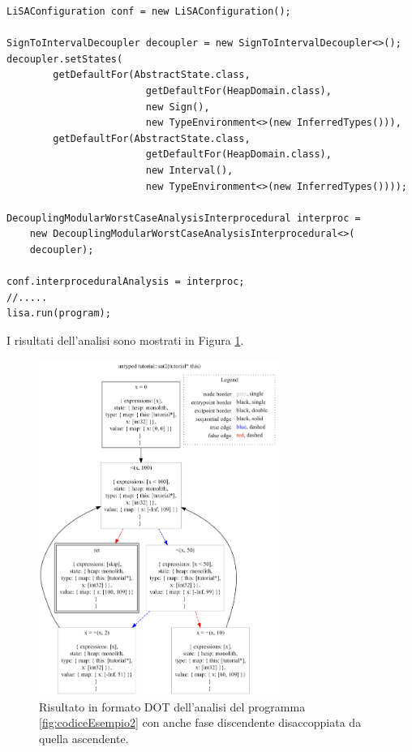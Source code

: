 \begin{lstlisting}[belowskip=-1.1 \baselineskip]
LiSAConfiguration conf = new LiSAConfiguration();

SignToIntervalDecoupler decoupler = new SignToIntervalDecoupler<>();
decoupler.setStates(
        getDefaultFor(AbstractState.class, 
                        getDefaultFor(HeapDomain.class), 
                        new Sign(), 
                        new TypeEnvironment<>(new InferredTypes())), 
        getDefaultFor(AbstractState.class, 
                        getDefaultFor(HeapDomain.class), 
                        new Interval(), 
                        new TypeEnvironment<>(new InferredTypes())));

DecouplingModularWorstCaseAnalysisInterprocedural interproc = 
    new DecouplingModularWorstCaseAnalysisInterprocedural<>(
    decoupler);

conf.interproceduralAnalysis = interproc;
//.....
lisa.run(program);
\end{lstlisting}
I risultati dell'analisi sono mostrati in Figura \ref{fig:risultatoDecoup}.
\begin{figure}[ht]
	\centering
	\includegraphics[width=0.7\textwidth]{Immagini/graphvizDecoup.png}
	\caption{Risultato in formato DOT dell'analisi del programma \ref{fig:codiceEsempio2} con anche fase discendente disaccoppiata da quella ascendente.}
	\label{fig:risultatoDecoup}
\end{figure}


